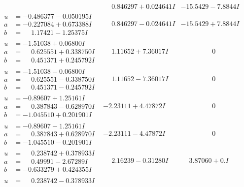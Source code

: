 \documentclass[1p]{elsarticle_modified}
\theoremstyle{definition}
\begin{document}
$$\begin{array}{c|c|c}
 & \phantom{-}0.846297 + 0.024641 I & -15.5429 - 7.8844 I \\ \hline\begin{aligned}
u &= -0.486377 - 0.050195 I \\
a &= -0.227084 + 0.673388 I \\
b &= \phantom{-}1.17421 - 1.25375 I\end{aligned}
 & \phantom{-}0.846297 - 0.024641 I & -15.5429 + 7.8844 I \\ \hline\begin{aligned}
u &= -1.51038 + 0.06800 I \\
a &= \phantom{-}0.625551 + 0.338750 I \\
b &= \phantom{-}0.451371 + 0.245792 I\end{aligned}
 & \phantom{-}1.11652 + 7.36017 I & \phantom{-0.000000 } 0 \\ \hline\begin{aligned}
u &= -1.51038 - 0.06800 I \\
a &= \phantom{-}0.625551 - 0.338750 I \\
b &= \phantom{-}0.451371 - 0.245792 I\end{aligned}
 & \phantom{-}1.11652 - 7.36017 I & \phantom{-0.000000 } 0 \\ \hline\begin{aligned}
u &= -0.89607 + 1.25161 I \\
a &= \phantom{-}0.387843 - 0.628970 I \\
b &= -1.045510 + 0.201901 I\end{aligned}
 & -2.23111 + 4.47872 I & \phantom{-0.000000 } 0 \\ \hline\begin{aligned}
u &= -0.89607 - 1.25161 I \\
a &= \phantom{-}0.387843 + 0.628970 I \\
b &= -1.045510 - 0.201901 I\end{aligned}
 & -2.23111 - 4.47872 I & \phantom{-0.000000 } 0 \\ \hline\begin{aligned}
u &= \phantom{-}0.238742 + 0.378933 I \\
a &= \phantom{-}0.49991 - 2.67289 I \\
b &= -0.633279 + 0.424355 I\end{aligned}
 & \phantom{-}2.16239 - 0.31280 I & \phantom{-}3.87060 + 0. I\phantom{ +0.000000I} \\ \hline\begin{aligned}
u &= \phantom{-}0.238742 - 0.378933 I \\

\end{aligned}
\end{array}$$
\end{document}
